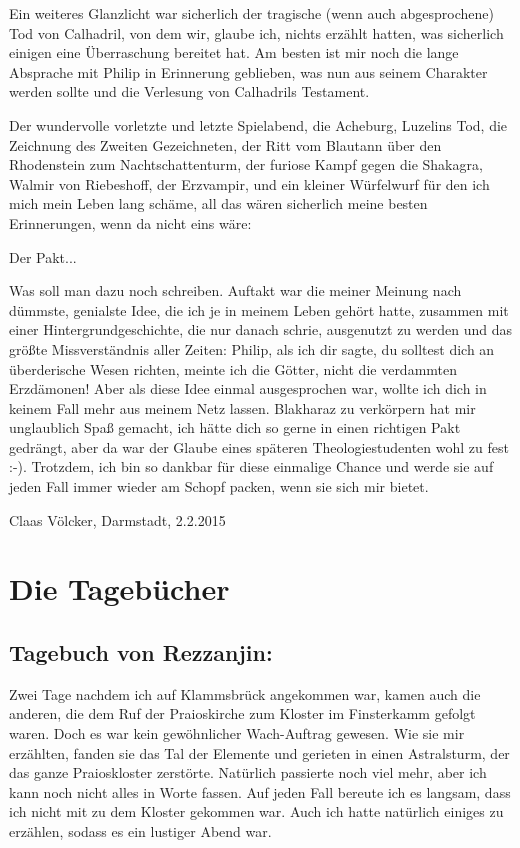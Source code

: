 \documentclass[11pt]{scrreprt}
\begin{document}
Ein weiteres Glanzlicht war sicherlich der tragische (wenn auch abgesprochene) Tod von Calhadril, von dem wir, glaube ich, nichts erzählt hatten, was sicherlich einigen eine Überraschung bereitet hat. Am besten ist mir noch die lange Absprache mit Philip in Erinnerung geblieben, was nun aus seinem Charakter werden sollte und die Verlesung von Calhadrils Testament.\par
Der wundervolle vorletzte und letzte Spielabend, die Acheburg, Luzelins Tod, die Zeichnung des Zweiten Gezeichneten, der Ritt vom Blautann über den Rhodenstein zum Nachtschattenturm, der furiose Kampf gegen die Shakagra, Walmir von Riebeshoff, der Erzvampir, und ein kleiner Würfelwurf für den ich mich mein Leben lang schäme, all das wären sicherlich meine besten Erinnerungen, wenn da nicht eins wäre:\par\bigskip

Der Pakt...\par
Was soll man dazu noch schreiben. Auftakt war die meiner Meinung nach dümmste, genialste Idee, die ich je in meinem Leben gehört hatte, zusammen mit einer Hintergrundgeschichte, die nur danach schrie, ausgenutzt zu werden und das größte Missverständnis aller Zeiten: Philip, als ich dir sagte, du solltest dich an überderische Wesen richten, meinte ich die Götter, nicht die verdammten Erzdämonen! Aber als diese Idee einmal ausgesprochen war, wollte ich dich in keinem Fall mehr aus meinem Netz lassen. Blakharaz zu verkörpern hat mir unglaublich Spaß gemacht, ich hätte dich so gerne in einen richtigen Pakt gedrängt, aber da war der Glaube eines späteren Theologiestudenten wohl zu fest :-). Trotzdem, ich bin so dankbar für diese einmalige Chance und werde sie auf jeden Fall immer wieder am Schopf packen, wenn sie sich mir bietet.

\begin{flushright}
Claas Völcker, Darmstadt, 2.2.2015
\end{flushright}



 
 
\section{Die Tagebücher}


\subsection{Tagebuch von Rezzanjin:}

Zwei Tage nachdem ich auf Klammsbrück angekommen war, kamen auch die anderen, die dem Ruf der Praioskirche zum Kloster im Finsterkamm gefolgt waren. Doch es war kein gewöhnlicher Wach-Auftrag gewesen. Wie sie mir erzählten, fanden sie das Tal der Elemente und gerieten in einen Astralsturm, der das ganze Praioskloster zerstörte. Natürlich passierte noch viel mehr, aber ich kann noch nicht alles in Worte fassen. Auf jeden Fall bereute ich es langsam, dass ich nicht mit zu dem Kloster gekommen war. Auch ich hatte natürlich einiges zu erzählen, sodass es ein lustiger Abend war.\par
\end{document}
